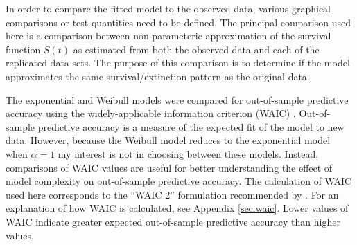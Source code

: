 \documentclass[12pt,letterpaper]{article}
\begin{document}
In order to compare the fitted model to the observed data, various graphical comparisons or test quantities need to be defined. The principal comparison used here is a comparison between non-parameteric approximation of the survival function \(S(t)\) as estimated from both the observed data and each of the replicated data sets. The purpose of this comparison is to determine if the model approximates the same survival/extinction pattern as the original data. 

The exponential and Weibull models were compared for out-of-sample predictive accuracy using the widely-applicable information criterion (WAIC) \citep{Watanabe2010a}. Out-of-sample predictive accuracy is a measure of the expected fit of the model to new data. However, because the Weibull model reduces to the exponential model when \(\alpha = 1\) my interest is not in choosing between these models. Instead, comparisons of WAIC values are useful for better understanding the effect of model complexity on out-of-sample predictive accuracy. The calculation of WAIC used here corresponds to the ``WAIC 2'' formulation recommended by \citet{Gelman2013d}. For an explanation of how WAIC is calculated, see Appendix \ref{sec:waic}. Lower values of WAIC indicate greater expected out-of-sample predictive accuracy than higher values.
\end{document}
